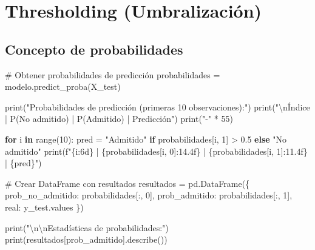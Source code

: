 \documentclass[
  doc,
  floatsintext,
  longtable,
  a4paper,
  nolmodern,
  notxfonts,
  notimes,
  12pt,
  colorlinks=true,linkcolor=blue,citecolor=blue,urlcolor=blue]{apa7}
\newenvironment{Shaded}{\begin{snugshade}}{\end{snugshade}}
\newcommand{\BuiltInTok}[1]{\textcolor[rgb]{0.00,0.23,0.31}{#1}}
\newcommand{\CharTok}[1]{\textcolor[rgb]{0.13,0.47,0.30}{#1}}
\newcommand{\CommentTok}[1]{\textcolor[rgb]{0.37,0.37,0.37}{#1}}
\newcommand{\ControlFlowTok}[1]{\textcolor[rgb]{0.00,0.23,0.31}{\textbf{#1}}}
\newcommand{\DecValTok}[1]{\textcolor[rgb]{0.68,0.00,0.00}{#1}}
\newcommand{\FloatTok}[1]{\textcolor[rgb]{0.68,0.00,0.00}{#1}}
\newcommand{\KeywordTok}[1]{\textcolor[rgb]{0.00,0.23,0.31}{\textbf{#1}}}
\newcommand{\NormalTok}[1]{\textcolor[rgb]{0.00,0.23,0.31}{#1}}
\newcommand{\OperatorTok}[1]{\textcolor[rgb]{0.37,0.37,0.37}{#1}}
\newcommand{\SpecialCharTok}[1]{\textcolor[rgb]{0.37,0.37,0.37}{#1}}
\newcommand{\SpecialStringTok}[1]{\textcolor[rgb]{0.13,0.47,0.30}{#1}}
\newcommand{\StringTok}[1]{\textcolor[rgb]{0.13,0.47,0.30}{#1}}
\begin{document}
\section{Thresholding
(Umbralización)}\label{thresholding-umbralizaciuxf3n}

\subsection{Concepto de
probabilidades}\label{concepto-de-probabilidades}

\begin{Shaded}
\begin{Highlighting}[]
\CommentTok{\# Obtener probabilidades de predicción}
\NormalTok{probabilidades }\OperatorTok{=}\NormalTok{ modelo.predict\_proba(X\_test)}

\BuiltInTok{print}\NormalTok{(}\StringTok{"Probabilidades de predicción (primeras 10 observaciones):"}\NormalTok{)}
\BuiltInTok{print}\NormalTok{(}\StringTok{"}\CharTok{\textbackslash{}n}\StringTok{Índice | P(No admitido) | P(Admitido) | Predicción"}\NormalTok{)}
\BuiltInTok{print}\NormalTok{(}\StringTok{"{-}"} \OperatorTok{*} \DecValTok{55}\NormalTok{)}

\ControlFlowTok{for}\NormalTok{ i }\KeywordTok{in} \BuiltInTok{range}\NormalTok{(}\DecValTok{10}\NormalTok{):}
\NormalTok{    pred }\OperatorTok{=} \StringTok{"Admitido"} \ControlFlowTok{if}\NormalTok{ probabilidades[i, }\DecValTok{1}\NormalTok{] }\OperatorTok{\textgreater{}} \FloatTok{0.5} \ControlFlowTok{else} \StringTok{"No admitido"}
    \BuiltInTok{print}\NormalTok{(}\SpecialStringTok{f"}\SpecialCharTok{\{}\NormalTok{i}\SpecialCharTok{:6d\}}\SpecialStringTok{ | }\SpecialCharTok{\{}\NormalTok{probabilidades[i, }\DecValTok{0}\NormalTok{]}\SpecialCharTok{:14.4f\}}\SpecialStringTok{ | }\SpecialCharTok{\{}\NormalTok{probabilidades[i, }\DecValTok{1}\NormalTok{]}\SpecialCharTok{:11.4f\}}\SpecialStringTok{ | }\SpecialCharTok{\{}\NormalTok{pred}\SpecialCharTok{\}}\SpecialStringTok{"}\NormalTok{)}

\CommentTok{\# Crear DataFrame con resultados}
\NormalTok{resultados }\OperatorTok{=}\NormalTok{ pd.DataFrame(\{}
    \StringTok{\textquotesingle{}prob\_no\_admitido\textquotesingle{}}\NormalTok{: probabilidades[:, }\DecValTok{0}\NormalTok{],}
    \StringTok{\textquotesingle{}prob\_admitido\textquotesingle{}}\NormalTok{: probabilidades[:, }\DecValTok{1}\NormalTok{],}
    \StringTok{\textquotesingle{}real\textquotesingle{}}\NormalTok{: y\_test.values}
\NormalTok{\})}

\BuiltInTok{print}\NormalTok{(}\StringTok{"}\CharTok{\textbackslash{}n\textbackslash{}n}\StringTok{Estadísticas de probabilidades:"}\NormalTok{)}
\BuiltInTok{print}\NormalTok{(resultados[}\StringTok{\textquotesingle{}prob\_admitido\textquotesingle{}}\NormalTok{].describe())}
\end{Highlighting}
\end{Shaded}
\end{document}
